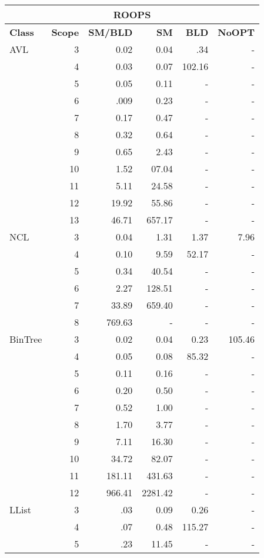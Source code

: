 \begin{table}
\scriptsize
\centering
\label{tab:results-obj2}
\begin{tabular}{ l r | r | r | r | r  }
  \toprule
  \multicolumn{6}{c}{\textbf{ROOPS}} \\
  \midrule 
  \textbf{Class} & \textbf{Scope} & \textbf{SM/BLD} & \textbf{SM}  & \textbf{BLD} & \textbf{NoOPT}  \\
  \midrule
  AVL
&	3	&	0.02	&	0.04	&	.34	&	-	\\
&	4	&	0.03	&	0.07	&	102.16	&	-	\\
&	5	&	0.05	&	0.11	&	-	&	-	\\
&	6	&	.009	&	0.23	&	-	&	-	\\
&	7	&	0.17	&	0.47	&	-	&	-	\\
&	8	&	0.32	&	0.64	&	-	&	-	\\
&	9	&	0.65	&	2.43	&	-	&	-	\\
&	10	&	1.52	&	07.04	&	-	&	-	\\
&	11	&	5.11	&	24.58	&	-	&	-	\\
&	12	&	19.92	&	55.86	&	-	&	-	\\
&	13	&	46.71	&	657.17	&	-	&	-	\\
  \midrule
  NCL
&	3	&	0.04	&	1.31	&	1.37	&	7.96	\\
&	4	&	0.10	&	9.59	&	52.17	&	-	\\
&	5	&	0.34	&	40.54	&	-	&	-	\\
&	6	&	2.27	&	128.51	&	-	&	-	\\
&	7	&	33.89	&	659.40	&	-	&	-	\\
&	8	&	769.63	&	-	&	-	&	-	\\
  \midrule
  BinTree
&	3	&	0.02	&	0.04	&	0.23	&	105.46	\\
&	4	&	0.05	&	0.08	&	85.32	&	-	\\
&	5	&	0.11	&	0.16	&	-	&	-	\\
&	6	&	0.20	&	0.50	&	-	&	-	\\
&	7	&	0.52	&	1.00	&	-	&	-	\\
&	8	&	1.70	&	3.77	&	-	&	-	\\
&	9	&	7.11	&	16.30	&	-	&	-	\\
&	10	&	34.72	&	82.07	&	-	&	-	\\
&	11	&	181.11	&	431.63	&	-	&	-	\\
&	12	&	966.41	&	2281.42	&	-	&	-	\\
  \midrule
  LList
&	3	&	.03	&	0.09	&	0.26	&	-	\\
&	4	&	.07	&	0.48	&	115.27	&	-	\\
&	5	&	.23	&	11.45	&	-	&	-	\\

\end{tabular}
\end{table}
